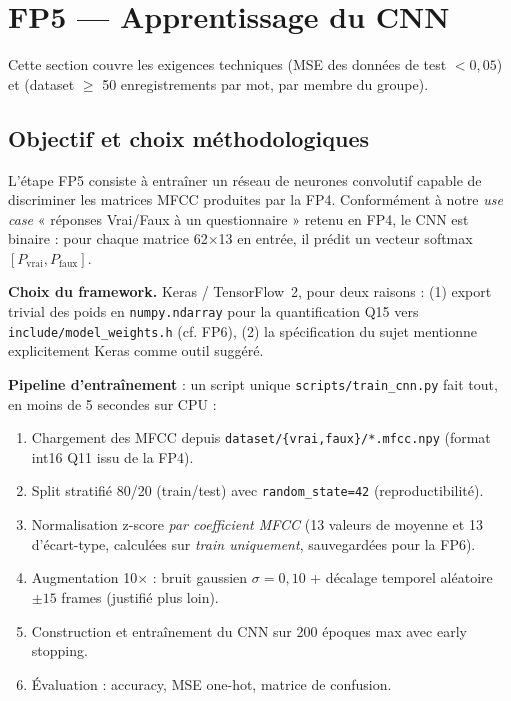 \section{FP5 --- Apprentissage du CNN}
\label{sec:fp5}

Cette section couvre les exigences techniques  (MSE des données de test $< 0{,}05$) et  (dataset $\geq$ 50 enregistrements par mot, par membre du groupe).

\subsection{Objectif et choix méthodologiques}

L'étape FP5 consiste à entraîner un réseau de neurones convolutif capable de discriminer les matrices MFCC produites par la FP4. Conformément à notre \emph{use case} « réponses Vrai/Faux à un questionnaire » retenu en FP4, le CNN est binaire : pour chaque matrice 62$\times$13 en entrée, il prédit un vecteur softmax $[P_\text{vrai}, P_\text{faux}]$.

\textbf{Choix du framework.} Keras / TensorFlow~2, pour deux raisons : (1) export trivial des poids en \texttt{numpy.ndarray} pour la quantification Q15 vers \texttt{include/model\_weights.h} (cf. FP6), (2) la spécification du sujet mentionne explicitement Keras comme outil suggéré.

\textbf{Pipeline d'entraînement} : un script unique \texttt{scripts/train\_cnn.py} fait tout, en moins de 5 secondes sur CPU :
\begin{enumerate}
    \item Chargement des MFCC depuis \texttt{dataset/\{vrai,faux\}/*.mfcc.npy} (format int16 Q11 issu de la FP4).
    \item Split stratifié 80/20 (train/test) avec \texttt{random\_state=42} (reproductibilité).
    \item Normalisation z-score \emph{par coefficient MFCC} (13 valeurs de moyenne et 13 d'écart-type, calculées sur \emph{train uniquement}, sauvegardées pour la FP6).
    \item Augmentation 10$\times$ : bruit gaussien $\sigma = 0{,}10$ + décalage temporel aléatoire $\pm 15$ frames (justifié plus loin).
    \item Construction et entraînement du CNN sur 200 époques max avec early stopping.
    \item Évaluation : accuracy, MSE one-hot, matrice de confusion.
\end{enumerate}

